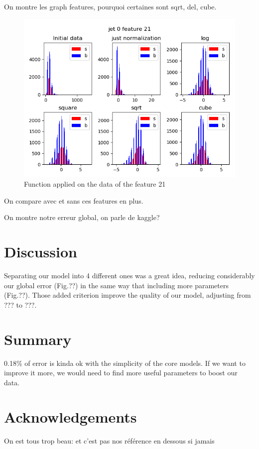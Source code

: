 \documentclass[10pt,conference,compsocconf]{IEEEtran}
\begin{document}
	On montre les graph features, pourquoi certaines sont sqrt, del, cube.
	\begin{figure}[tbp]
		\centering
		\includegraphics[width=\columnwidth]{21_0}
		\caption{Function applied on the data of the feature 21}
		\vspace{-3mm}
		\label{fig:feature21function}
	\end{figure}
	On compare avec et sans ces features en plus.
	
	On montre notre erreur global, on parle de kaggle?
	
	
	
	\section{Discussion}
	
	Separating our model into 4 different ones was a great idea, reducing considerably our global error (Fig.??) in the same way that including more parameters (Fig.??). Those added criterion improve the quality of our model, adjusting from ??? to ???.    
	
	
	
	\section{Summary}
	0.18\% of error is kinda ok with the simplicity of the core models. If we want to improve it more, we would need to find more useful parameters to boost our data.
	
	\section*{Acknowledgements}
	On est tous trop beau: et c'est pas nos r\'ef\'erence en dessous si jamais
	
	
	
	
\end{document}
